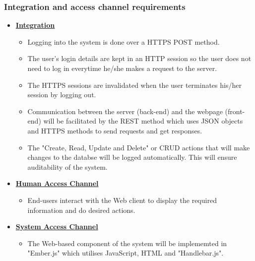\documentclass[a4paper,12pt]{article}
\begin{document}
\subsubsection{Integration and access channel requirements}
	\begin{itemize}
		\item{\bfseries \underline{Integration}}
		\begin{itemize}
           		\item Logging into the system is done over a HTTPS POST method.
			\item The user's login details are kept in an HTTP session so the user does not need to log in everytime he/she 					makes a request to the server.
			\item The HTTPS sessions are invalidated when the user terminates his/her session by logging out.
			\item Communication between the server (back-end) and the webpage (front-end) will be facilitated by the REST 					method which uses JSON objects and HTTPS methods to send requests and get responses.
			\item The "Create, Read, Update and Delete" or CRUD actions that will make changes to the databse will be 					logged automatically. This will ensure auditability of the system. 
		\end{itemize}

		\item{\bfseries \underline{Human Access Channel}}
			\begin{itemize}
				\item End-users interact with the Web client to display the required information and do desired actions. 
			\end{itemize}

		\item{\bfseries \underline{System Access Channel}}
			\begin{itemize}
				\item The Web-based component of the system will be implememted in "Ember.js" which utilises JavaScript, 				HTML and "Handlebar.js".  
			\end{itemize}
	\end{itemize}

\end{document}

